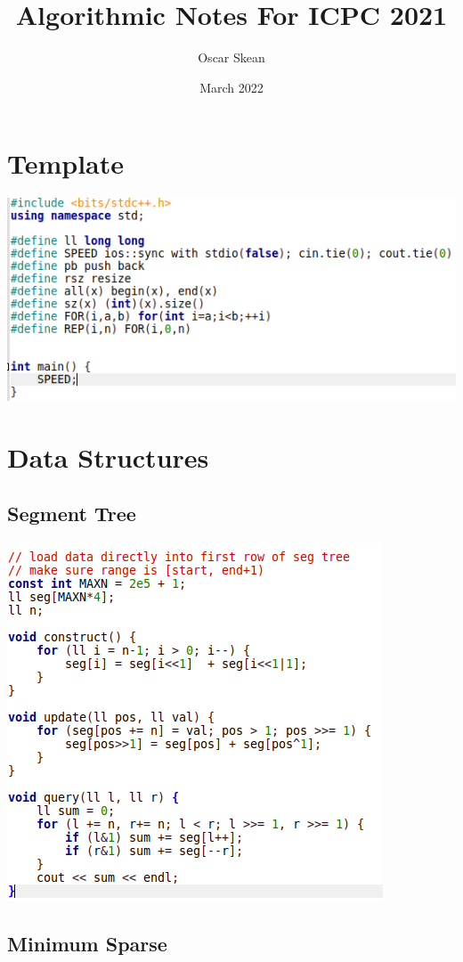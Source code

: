 \documentclass[11pt,twocolumn]{article}
\title{Algorithmic Notes For ICPC 2021}
\author{Oscar Skean}
\date{March 2022}
\begin{document}
\maketitle

\section{Template}
\includegraphics[scale=0.4]{template}

\section{Data Structures}
\subsection{Segment Tree}

\includegraphics[scale=0.4]{segmenttree}

\subsection{Minimum Sparse}
\end{document}

